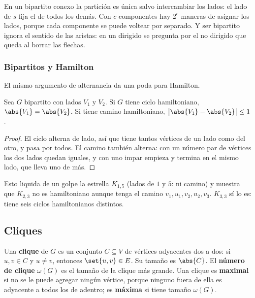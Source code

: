 \documentclass[11pt,letterpaper]{article}
\begin{document}
\begin{observacion}
  En un bipartito conexo la partición es única salvo intercambiar los
  lados: el lado de $s$ fija el de todos los demás. Con $c$
  componentes hay $2^c$ maneras de asignar los lados, porque cada
  componente se puede voltear por separado. Y ser bipartito ignora el
  sentido de las aristas: en un dirigido se pregunta por el no
  dirigido que queda al borrar las flechas.
\end{observacion}

\subsubsection*{Bipartitos y Hamilton}

El mismo argumento de alternancia da una poda para Hamilton.

\begin{corolario}
  \label{cor:bipartito-hamilton}
  Sea $G$ bipartito con lados $V_1$ y $V_2$. Si $G$ tiene ciclo
  hamiltoniano, $\abs{V_1} = \abs{V_2}$. Si tiene camino
  hamiltoniano, $\bigl| \abs{V_1} - \abs{V_2} \bigr| \le 1$.
\end{corolario}

\begin{proof}
  El ciclo alterna de lado, así que tiene tantos vértices de un lado
  como del otro, y pasa por todos. El camino también alterna: con un
  número par de vértices los dos lados quedan iguales, y con uno impar
  empieza y termina en el mismo lado, que lleva uno de más.
\end{proof}

Esto liquida de un golpe la estrella $K_{1,5}$ (lados de $1$ y $5$:
ni camino) y muestra que $K_{2,3}$ no es hamiltoniano aunque tenga el
camino $v_1, u_1, v_2, u_2, v_3$. $K_{3,3}$ sí lo es: tiene seis
ciclos hamiltonianos distintos.


\subsection*{Cliques}

\begin{definicion}[Clique]
  \label{def:clique}
  Una \textbf{clique} de $G$ es un conjunto $C \subseteq V$ de
  vértices adyacentes dos a dos: si $u, v \in C$ y $u \ne v$,
  entonces $\set{u, v} \in E$. Su tamaño es $\abs{C}$. El
  \textbf{número de clique} $\omega(G)$ es el tamaño de la clique más
  grande. Una clique es \textbf{maximal} si no se le puede agregar
  ningún vértice, porque ninguno fuera de ella es adyacente a todos
  los de adentro; es \textbf{máxima} si tiene tamaño $\omega(G)$.
\end{definicion}
\end{document}
